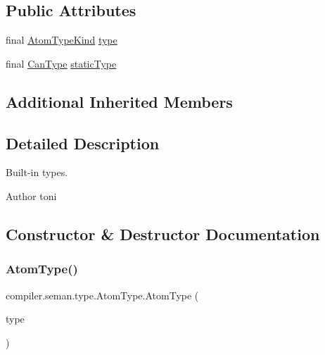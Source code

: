 \subsection*{Public Attributes}
\begin{DoxyCompactItemize}
\item 
final \hyperlink{enumcompiler_1_1abstr_1_1tree_1_1_atom_type_kind}{Atom\+Type\+Kind} \hyperlink{classcompiler_1_1seman_1_1type_1_1_atom_type_af4ae9198f0cfb5fef748ea2730ef2dcf}{type}
\item 
final \hyperlink{classcompiler_1_1seman_1_1type_1_1_can_type}{Can\+Type} \hyperlink{classcompiler_1_1seman_1_1type_1_1_atom_type_af822b5cb4cb7d9ae5de8a373c14e6656}{static\+Type}
\end{DoxyCompactItemize}
\subsection*{Additional Inherited Members}


\subsection{Detailed Description}
Built-\/in types.

\begin{DoxyAuthor}{Author}
toni 
\end{DoxyAuthor}


\subsection{Constructor \& Destructor Documentation}
\mbox{\label{classcompiler_1_1seman_1_1type_1_1_atom_type_ab6b336d76df37a9432e9fbe4b511eae3}} 
\subsubsection{\texorpdfstring{Atom\+Type()}{AtomType()}}
{\footnotesize\ttfamily compiler.\+seman.\+type.\+Atom\+Type.\+Atom\+Type (\begin{DoxyParamCaption}\item[{\hyperlink{enumcompiler_1_1abstr_1_1tree_1_1_atom_type_kind}{Atom\+Type\+Kind}}]{type }\end{DoxyParamCaption})}

